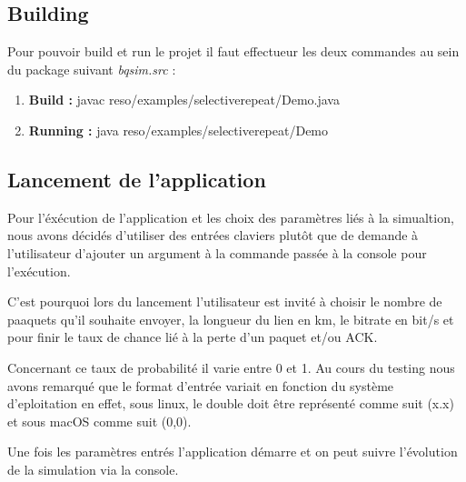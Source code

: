 \documentclass[../rapport.tex]{subfiles}
\begin{document}
\subsection{Building}

	Pour pouvoir build et run le projet il faut effectueur les deux commandes au sein du package 
	suivant \textit{bqsim.src} : 
		
		\begin{enumerate}
			\item\textbf{Build : }  javac reso/examples/selectiverepeat/Demo.java
			\item\textbf{Running :} java reso/examples/selectiverepeat/Demo

		\end{enumerate}

\subsection{Lancement de l'application} 

Pour l'éxécution de l'application et les choix des paramètres liés à la simualtion, nous avons
décidés d'utiliser des entrées claviers plutôt que de demande à l'utilisateur d'ajouter
un argument à la commande passée à la console pour l'exécution. 

\medskip

C'est pourquoi lors du lancement l'utilisateur est invité à choisir le nombre de paaquets
qu'il souhaite envoyer, la longueur du lien en km, le bitrate en bit/s et pour finir 
le taux de chance lié à la perte d'un paquet et/ou ACK.

\medskip

Concernant ce taux de probabilité il varie entre 0 et 1. Au cours du testing nous avons remarqué
que le format d'entrée variait en fonction du système d'eploitation en effet, sous linux, le 
double doit être représenté comme suit (x.x) et sous macOS comme suit (0,0).

\medskip 

Une fois les paramètres entrés l'application démarre et on peut suivre l'évolution de la 
simulation via la console.

\newpage
\end{document}
